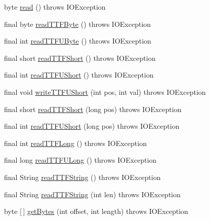 \begin{DoxyCompactItemize}
\item 
byte \mbox{\hyperlink{classorg_1_1newdawn_1_1slick_1_1tools_1_1hiero_1_1truetype_1_1_font_file_reader_ac93685926f64d681f19741f63e569e10}{read}} ()  throws I\+O\+Exception 
\item 
final byte \mbox{\hyperlink{classorg_1_1newdawn_1_1slick_1_1tools_1_1hiero_1_1truetype_1_1_font_file_reader_ad8ae5f03abb0907cb8162ae2d266129e}{read\+T\+T\+F\+Byte}} ()  throws I\+O\+Exception 
\item 
final int \mbox{\hyperlink{classorg_1_1newdawn_1_1slick_1_1tools_1_1hiero_1_1truetype_1_1_font_file_reader_af208587b367fbf19afbfd0cb584b7563}{read\+T\+T\+F\+U\+Byte}} ()  throws I\+O\+Exception 
\item 
final short \mbox{\hyperlink{classorg_1_1newdawn_1_1slick_1_1tools_1_1hiero_1_1truetype_1_1_font_file_reader_a3a41dc0c99664d00bf0a42ec3d90e584}{read\+T\+T\+F\+Short}} ()  throws I\+O\+Exception 
\item 
final int \mbox{\hyperlink{classorg_1_1newdawn_1_1slick_1_1tools_1_1hiero_1_1truetype_1_1_font_file_reader_a3e37dc36dda05c50af2f546cb377af6c}{read\+T\+T\+F\+U\+Short}} ()  throws I\+O\+Exception 
\item 
final void \mbox{\hyperlink{classorg_1_1newdawn_1_1slick_1_1tools_1_1hiero_1_1truetype_1_1_font_file_reader_af54e507e6214364524b6223add00d11c}{write\+T\+T\+F\+U\+Short}} (int pos, int val)  throws I\+O\+Exception 
\item 
final short \mbox{\hyperlink{classorg_1_1newdawn_1_1slick_1_1tools_1_1hiero_1_1truetype_1_1_font_file_reader_a073573f88e9174bcfc819be0147a74db}{read\+T\+T\+F\+Short}} (long pos)  throws I\+O\+Exception 
\item 
final int \mbox{\hyperlink{classorg_1_1newdawn_1_1slick_1_1tools_1_1hiero_1_1truetype_1_1_font_file_reader_aed5c964c32c70b938200cf458607788a}{read\+T\+T\+F\+U\+Short}} (long pos)  throws I\+O\+Exception 
\item 
final int \mbox{\hyperlink{classorg_1_1newdawn_1_1slick_1_1tools_1_1hiero_1_1truetype_1_1_font_file_reader_a6026dd8cdf3d1c3cfba14f945a12898d}{read\+T\+T\+F\+Long}} ()  throws I\+O\+Exception 
\item 
final long \mbox{\hyperlink{classorg_1_1newdawn_1_1slick_1_1tools_1_1hiero_1_1truetype_1_1_font_file_reader_a5646e80cf595cce3fc98b03fa91f13fb}{read\+T\+T\+F\+U\+Long}} ()  throws I\+O\+Exception 
\item 
final String \mbox{\hyperlink{classorg_1_1newdawn_1_1slick_1_1tools_1_1hiero_1_1truetype_1_1_font_file_reader_a7807f4435a65fbb74d920eb0562f4f33}{read\+T\+T\+F\+String}} ()  throws I\+O\+Exception 
\item 
final String \mbox{\hyperlink{classorg_1_1newdawn_1_1slick_1_1tools_1_1hiero_1_1truetype_1_1_font_file_reader_a80d72654cc79c5d7e13a357d7231a826}{read\+T\+T\+F\+String}} (int len)  throws I\+O\+Exception 
\item 
byte \mbox{[}$\,$\mbox{]} \mbox{\hyperlink{classorg_1_1newdawn_1_1slick_1_1tools_1_1hiero_1_1truetype_1_1_font_file_reader_aab6f3aa748ed12098074c3448471866e}{get\+Bytes}} (int offset, int length)  throws I\+O\+Exception 
\end{DoxyCompactItemize}
